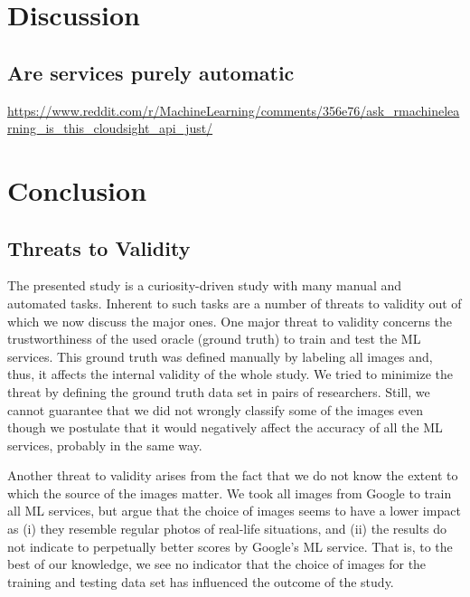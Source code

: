 \documentclass[sigconf,review,anonymous]{acmart}
\begin{document}

\section{Discussion}

\subsection{Are services purely automatic}
\url{https://www.reddit.com/r/MachineLearning/comments/356e76/ask_rmachinelearning_is_this_cloudsight_api_just/}

\section{Conclusion}

\subsection{Threats to Validity}
The presented study is a curiosity-driven study with many manual and automated tasks. Inherent to such tasks are a number of threats to validity out of which we now discuss the major ones. One major threat to validity concerns the trustworthiness of the used oracle (ground truth) to train and test the ML services. This ground truth was defined manually by labeling all images and, thus, it affects the internal validity of the whole study. We tried to minimize the threat by defining the ground truth data set in pairs of researchers. Still, we cannot guarantee that we did not wrongly classify some of the images even though we postulate that it would negatively affect the accuracy of all the ML services, probably in the same way. 

Another threat to validity arises from the fact that we do not know the extent to which the source of the images matter. We took all images from Google to train all ML services, but argue that the choice of images seems to have a lower impact as (i) they resemble regular photos of real-life situations, and (ii) the results do not indicate to perpetually better scores by Google's ML service. That is, to the best of our knowledge, we see no indicator that the choice of images for the training and testing data set has influenced the outcome of the study. 
\end{document}
